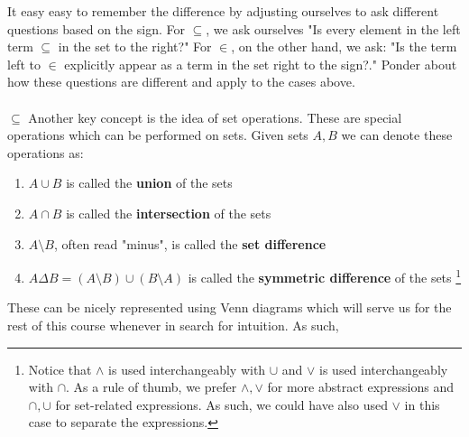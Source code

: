 \documentclass{tufte-handout} %
\theoremstyle{definition}
\theoremstyle{remark}
\begin{document}
It easy easy to remember the difference by adjusting ourselves to ask different questions based on the sign. For $\subseteq$, we ask ourselves "Is every element in the left term $\subseteq$ in the set to the right?" For $\in$, on the other hand, we ask: "Is the term left to $\in$ explicitly appear as a term in the set right to the sign?." Ponder about how these questions are different and apply to the cases above. 
\\\\$\subseteq$
Another key concept is the idea of set operations. These are special operations which can be performed on sets. Given sets $A,B$ we can denote these operations as:
\begin{enumerate}
    \item $A\cup B $ is called the \textbf{union} of the sets
    \item $A\cap B $ is called the \textbf{intersection} of the sets
    \item $A\setminus B $, often read "minus", is called the \textbf{set difference} 
    \item $A\Delta B = (A\setminus B) \cup (B\setminus A)$ is called the \textbf{symmetric difference} of the sets \footnote{Notice that $\wedge$ is used interchangeably with $\cup$ and $\vee$ is used interchangeably with $\cap$. As a rule of thumb, we prefer $\wedge, \vee$ for more abstract expressions and $\cap, \cup$ for set-related expressions. As such, we could have also used $\vee$ in this case to separate the expressions.}
\end{enumerate}
These can be nicely represented using Venn diagrams which will serve us for the rest of this course whenever in search for intuition. As such,
\\
\def\firstcircle{(0,0) circle (1.05cm)}
\def\secondcircle{(0:1.4cm) circle (1.05cm)}

\end{document}
